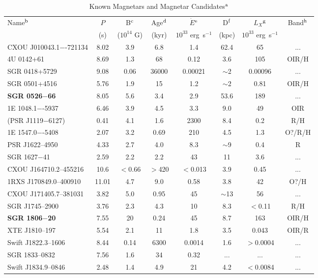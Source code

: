 \begin{table}
\caption{Known Magnetars and Magnetar Candidates$^{\rm a}$}
\label{tab1}
\begin{center}
\begin{tabular}{@{}l|c|c|c|c|c|c|c@{}}
\hline
Name$^{\rm b}$ & $P$ & B$^{\rm c}$ & Age$^{\rm d}$ & $\dot{E}$$^{\rm e}$ & D$^{\rm f}$ & $L_X$$^{\rm g}$ & Band$^{\rm h}$ \\
     & (s) & ($10^{14}$ G) & (kyr) & $10^{33}$ erg~s$^{-1}$ & (kpc) & $10^{33}$ erg~s$^{-1}$ &  \\
\hline
CXOU J010043.1−-721134 & 8.02 & 3.9 & 6.8 & 1.4 & 62.4 & 65 & ... \\
4U 0142+61 & 8.69 & 1.3 & 68 & 0.12&  3.6 & 105 &  OIR/H \\
SGR 0418+5729 & 9.08 & 0.06 & 36000 & 0.00021 & $\sim$2 & 0.00096 &  ... \\
SGR 0501+4516 & 5.76 & 1.9 & 15 & 1.2& $\sim$2 & 0.81 & OIR/H  \\
{\bf SGR 0526$-$66} & 8.05 & 5.6 & 3.4 & 2.9 & 53.6 & 189 &  ... \\
1E 1048.1−-5937 & 6.46 & 3.9 & 4.5 & 3.3 & 9.0 & 49 &  OIR \\
(PSR J1119$-$6127) & 0.41 & 4.1 & 1.6 & 2300 & 8.4 & 0.2 & R/H \\
1E 1547.0−-5408 & 2.07 & 3.2 & 0.69 & 210 & 4.5 & 1.3 & O?/R/H \\
PSR J1622--4950 & 4.33 & 2.7 & 4.0 & 8.3 & $\sim$9 & 0.4 & R \\
SGR 1627$-$41 & 2.59 & 2.2 & 2.2 & 43 & 11 & 3.6 & ...\\
CXOU J164710.2--455216 & 10.6 & $<$0.66 & $>$420& $<$0.013 & 3.9 & 0.45 &  ...  \\
1RXS J170849.0--400910 & 11.01 & 4.7 & 9.0 & 0.58 & 3.8 & 42 & O?/H \\
CXOU J171405.7--381031 & 3.82 & 5.0 & 0.95 & 45 & $\sim$13 & 56 & ...\\
SGR J1745--2900 & 3.76 & 2.3 & 4.3 & 10& 8.3 & $<$0.11 &  R/H \\
{\bf SGR 1806$-$20} & 7.55 & 20 & 0.24 &45 & 8.7 & 163 &  OIR/H \\
XTE J1810--197 & 5.54 & 2.1 & 11 & 1.8& 3.5 & 0.043 & OIR/R \\
Swift J1822.3--1606 & 8.44 & 0.14 & 6300 & 0.0014 & 1.6 & $>$0.0004 &  ... \\
SGR 1833--0832 & 7.56 & 1.6 & 34 & 0.32 & ... & ... & ... \\
Swift J1834.9--0846 & 2.48 & 1.4 & 4.9 & 21 & 4.2 & $<$0.0084 & ... \\

\end{tabular}
\end{center}
\end{table}

